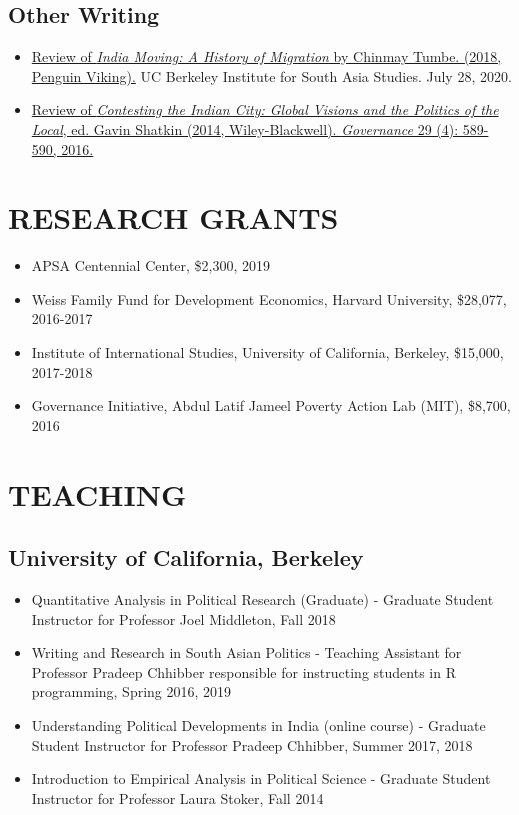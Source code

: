 \documentclass[10pt]{article}
\begin{document}
\subsection*{Other Writing}	
\begin{itemize}
\item[]\href{https://southasia.berkeley.edu/sites/default/files/shared/India_Center/India_Moving.pdf}{Review of \textit{India Moving: A History of Migration} by Chinmay Tumbe. (2018, Penguin Viking).}  UC Berkeley Institute for South Asia Studies. July 28, 2020.
\item[] \href{http://onlinelibrary.wiley.com/doi/10.1111/gove.12241/abstract}{Review of \textit{Contesting the Indian City: Global Visions and the Politics of the Local}, ed. Gavin Shatkin (2014, Wiley-Blackwell). \textit{Governance} 29 (4): 589-590, 2016.} \

\end{itemize}
\vspace{3mm}
\section*{RESEARCH GRANTS}

\begin{itemize}[nosep]
\item[] APSA Centennial Center, \$2,300, 2019

\item[] Weiss Family Fund for Development Economics, Harvard University, \$28,077, 2016-2017
	 
\item[]Institute of International Studies, University of California, Berkeley, \$15,000, 2017-2018
\item[] Governance Initiative, Abdul Latif Jameel Poverty Action Lab (MIT), \$8,700, 2016	
\end{itemize}


\vspace{3mm}
\section*{TEACHING}


\subsection*{University of California, Berkeley}

\begin{itemize}
	\item[]Quantitative Analysis in Political Research (Graduate) - Graduate Student Instructor for Professor Joel Middleton, Fall 2018 
		\item[]Writing and Research in South Asian Politics - Teaching Assistant for Professor Pradeep Chhibber responsible for instructing students in \textsf{R} programming, Spring 2016, 2019
	\item[]Understanding Political Developments in India (online course) - Graduate Student Instructor for Professor Pradeep Chhibber, Summer 2017, 2018
	\item[]Introduction to Empirical Analysis in Political Science - Graduate Student Instructor for Professor Laura Stoker, Fall 2014	
\end{itemize}
\end{document}

